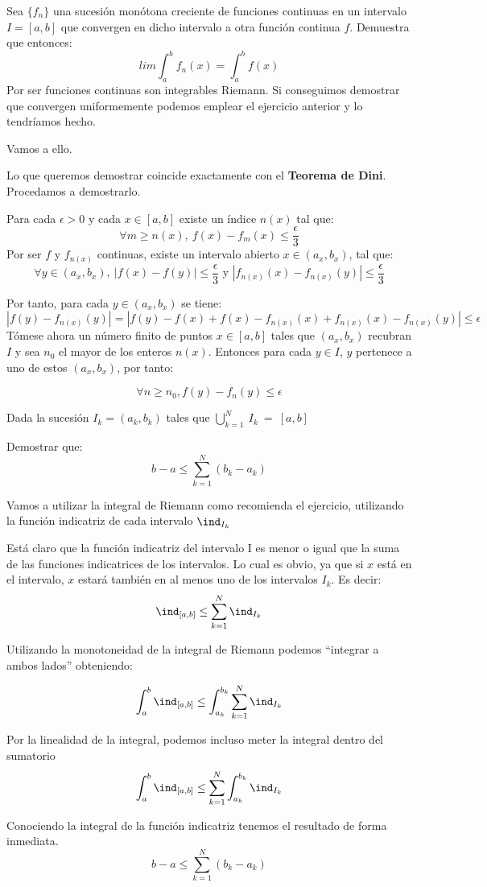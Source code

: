 \begin{problem}[6]

Sea $\lbrace f_n \rbrace$ una sucesión monótona creciente de funciones continuas en un intervalo $I=[a,b]$ que convergen en dicho intervalo a otra función continua $f$. Demuestra que entonces:
\[ lim \int_{a}^{b} f_n(x) = \int_{a}^{b} f(x) \]
\solution
Por ser funciones continuas son integrables Riemann. Si conseguimos demostrar que convergen uniformemente podemos emplear el ejercicio anterior y lo tendríamos hecho.

Vamos a ello.


Lo que queremos demostrar coincide exactamente con el \textbf{Teorema de Dini}.
Procedamos a demostrarlo.

Para cada $\epsilon > 0$ y cada $x\in[a,b]$ existe un índice $n(x)$ tal que:
\[\forall m\geq n(x), \ f(x)-f_m(x) \leq \frac{\epsilon}{3}\]
Por ser $f$ y $f_{n(x)}$ continuas, existe un intervalo abierto $x\in(a_x,b_x)$, tal que:
\[\forall y \in (a_x,b_x), \ |f(x)-f(y)| \leq \frac{\epsilon}{3} \text{ y } |f_{n(x)}(x)-f_{n(x)}(y)| \leq \frac{\epsilon}{3}\]

Por tanto, para cada $y\in(a_x, b_x)$ se tiene:
\[|f(y)-f_{n(x)}(y)| = |f(y)-f(x)+f(x)-f_{n(x)}(x)+f_{n(x)}(x)-f_{n(x)}(y)|\leq \epsilon\]
Tómese ahora un número finito de puntos $x \in [a,b]$ tales que $(a_x,b_x)$ recubran $I$ y sea $n_0$ el mayor de los enteros $n(x)$. Entonces para cada $y\in I$, $y$ pertenece a uno de estos $(a_x,b_x)$, por tanto:

\[ \forall n\geq n_0, f(y)-f_n(y) \leq \epsilon\]

\end{problem}

\begin{problem}[7]
Dada la sucesión $I_k = (a_k, b_k)$ tales que $\bigcup_{k=1}^{N}~I_k~=~[a,b]$

Demostrar que:
\[b-a \leq \sum_{k=1}^N (b_k - a_k)\]

\solution
Vamos a utilizar la integral de Riemann como recomienda el ejercicio, utilizando la función indicatriz de cada intervalo $\ind_{I_k}$

Está claro que la función indicatriz del intervalo I es menor o igual que la suma de las funciones indicatrices de los intervalos. Lo cual es obvio, ya que si $x$ está en el intervalo, $x$ estará también en al menos uno de los intervalos $I_k$. Es decir:
\[\ind_{[a,b]} \leq \sum_{k=1}^{N} \ind_{I_k}\]

Utilizando la monotoneidad de la integral de Riemann podemos ``integrar a ambos lados'' obteniendo:

\[\int_{a}^{b} \ind_{[a,b]} \leq \int_{a_k}^{b_k} \sum_{k=1}^{N} \ind_{I_k}\]

Por la linealidad de la integral, podemos incluso meter la integral dentro del sumatorio
\[\int_{a}^{b} \ind_{[a,b]} \leq \sum_{k=1}^{N} \int_{a_k}^{b_k} \ind_{I_k}\]


Conociendo la integral de la función indicatriz tenemos el resultado de forma inmediata.
\[b-a \leq \sum_{k=1}^{N} ( b_k - a_k )\]

\end{problem}


